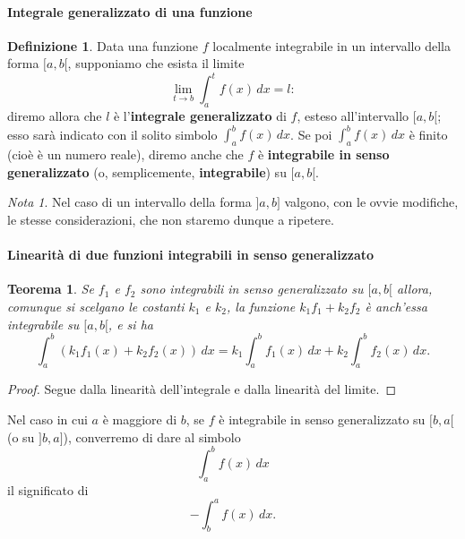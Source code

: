 \documentclass{article}
\theoremstyle{plain}
\newtheorem{thm}{Teorema}[section]
\theoremstyle{definition}
\newtheorem{defn}{Definizione}[section]
\theoremstyle{remark}
\newtheorem{note}{Nota}
\begin{document}
\paragraph{Integrale generalizzato di una funzione}
\begin{bxthm}
\begin{defn}
    Data una funzione $f$ localmente integrabile in un intervallo della forma $[a,b[$, supponiamo che esista il limite 
    \[\lim_{t\to b}\int_{a}^{t}f(x)\,dx=l:\]
    diremo allora che $l$ è l'\textbf{integrale generalizzato} di $f$, esteso all'intervallo $[a,b[$; esso sarà indicato con il solito simbolo 
    $\int_{a}^{b}f(x)\,dx$. Se poi $\int_{a}^{b}f(x)\,dx$ è finito (cioè è un numero reale), diremo anche che $f$ è \textbf{integrabile in senso generalizzato} (o, 
    semplicemente, \textbf{integrabile}) su $[a,b[$.
\end{defn}
\end{bxthm}

\vspace{10pt}

\begin{note}
    Nel caso di un intervallo della forma $]a,b]$ valgono, con le ovvie modifiche, le stesse considerazioni, che non staremo dunque a ripetere.
\end{note}

\vspace{10pt}

\paragraph{Linearità di due funzioni integrabili in senso generalizzato}
\begin{bxthm}
\begin{thm}
    Se $f_1$ e $f_2$ sono integrabili in senso generalizzato su $[a,b[$ allora, comunque si scelgano le costanti $k_1$ e $k_2$, la funzione $k_1f_1+k_2f_2$ è anch'essa integrabile su $[a,b[$, e si ha 
    \[\int_{a}^{b}(k_1f_1(x)+k_2f_2(x))\,dx=k_1\int_{a}^{b}f_1(x)\,dx+k_2\int_{a}^{b}f_2(x)\,dx.\]
\end{thm}
\end{bxthm}
\begin{proof}
    Segue dalla linearità dell'integrale e dalla linearità del limite.
\end{proof}

\vspace{10pt}

Nel caso in cui $a$ è maggiore di $b$, se $f$ è integrabile in senso generalizzato su $[b,a[$ (o su $]b,a]$), converremo di dare al simbolo \[\int_{a}^{b}f(x)\,dx\] il significato di \[-\int_{b}^{a}f(x)\,dx.\]
\end{document}
